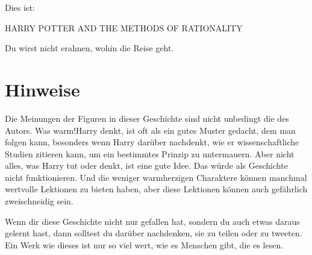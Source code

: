 \begin{center}
Dies ist:

HARRY POTTER AND THE METHODS OF RATIONALITY

Du wirst nicht erahnen, wohin die Reise geht.
\end{center}

\section*{Hinweise}
Die Meinungen der Figuren in dieser Geschichte sind nicht unbedingt die des Autors. Was warm!Harry denkt, ist oft als ein gutes Muster gedacht, dem man folgen kann, besonders wenn Harry darüber nachdenkt, wie er wissenschaftliche Studien zitieren kann, um ein bestimmtes Prinzip zu untermauern. Aber nicht alles, was Harry tut oder denkt, ist eine gute Idee. Das würde als Geschichte nicht funktionieren. Und die weniger warmherzigen Charaktere können manchmal wertvolle Lektionen zu bieten haben, aber diese Lektionen können auch gefährlich zweischneidig sein.


Wenn dir diese Geschichte nicht nur gefallen hat, sondern du auch etwas daraus gelernt hast, dann solltest du darüber nachdenken, sie zu teilen oder zu tweeten. Ein Werk wie dieses ist nur so viel wert, wie es Menschen gibt, die es lesen.
